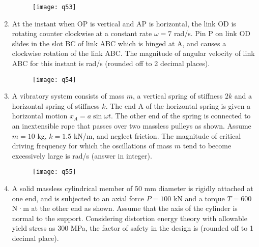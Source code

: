 \documentclass[journal,11pt,onecolumn]{IEEEtran}
\begin{document}
\begin{enumerate}[resume]
          \begin{figure}[H]
              \centering
              \texttt{[image: q53]}
              \caption{}
              \label{fig:q53}
          \end{figure}

    \item At the instant when OP is vertical and AP is horizontal, the link OD is rotating counter clockwise at a constant rate $\omega = 7$ rad/s. Pin P on link OD slides in the slot BC of link ABC which is hinged at A, and causes a clockwise rotation of the link ABC. The magnitude of angular velocity of link ABC for this instant is \underline{\hspace{2cm}} rad/s (rounded off to 2 decimal places).

          \begin{figure}[H]
              \centering
              \texttt{[image: q54]}
              \caption{}
              \label{fig:q54}
          \end{figure}

    \item A vibratory system consists of mass $m$, a vertical spring of stiffness $2k$ and a horizontal spring of stiffness $k$. The end A of the horizontal spring is given a horizontal motion $x_A = a \sin \omega t$. The other end of the spring is connected to an inextensible rope that passes over two massless pulleys as shown. Assume $m = 10$ kg, $k=1.5$ kN/m, and neglect friction. The magnitude of critical driving frequency for which the oscillations of mass $m$ tend to become excessively large is \underline{\hspace{2cm}} rad/s (answer in integer).

          \begin{figure}[H]
              \centering
              \texttt{[image: q55]}
              \caption{}
              \label{fig:q55}
          \end{figure}

    \item A solid massless cylindrical member of 50 mm diameter is rigidly attached at one end, and is subjected to an axial force $P = 100$ kN and a torque $T = 600$ N·m at the other end as shown. Assume that the axis of the cylinder is normal to the support. Considering distortion energy theory with allowable yield stress as 300 MPa, the factor of safety in the design is \underline{\hspace{2cm}} (rounded off to 1 decimal place).


\end{enumerate}
\end{document}
